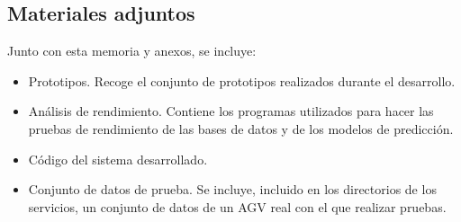 \subsection{Materiales adjuntos}

Junto con esta memoria y anexos, se incluye:
\begin{itemize}
    \item Prototipos. Recoge el conjunto de prototipos realizados durante el desarrollo.
    \item Análisis de rendimiento. Contiene los programas utilizados para hacer las pruebas de rendimiento 
        de las bases de datos y de los modelos de predicción.
    \item Código del sistema desarrollado.
    \item Conjunto de datos de prueba. Se incluye, incluido en los directorios de los servicios, un conjunto de datos de un AGV 
        real con el que realizar pruebas.
\end{itemize}